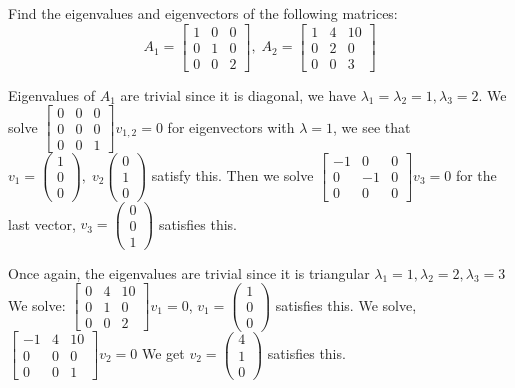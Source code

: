 \documentclass[11pt]{article}
\begin{document}
Find the eigenvalues and eigenvectors of the following matrices:
$$A_1 = \begin{bmatrix}
    1 & 0 & 0 \\
    0 & 1 & 0 \\
    0 & 0 & 2
\end{bmatrix}, \; A_2 = \begin{bmatrix}
    1 & 4 & 10 \\
    0 & 2 & 0 \\
    0 & 0 & 3
\end{bmatrix}$$

\soln

Eigenvalues of $A_1$ are trivial since it is diagonal,
we have $\lambda_1 = \lambda_2 = 1, \lambda_3 = 2$.
We solve $\begin{bmatrix}
    0 & 0 & 0 \\
    0 & 0 & 0 \\
    0 & 0 & 1
\end{bmatrix} v_{1,2} = 0$ for eigenvectors with $\lambda = 1$,
we see that $v_1 = \begin{pmatrix}
    1 \\ 0 \\ 0
\end{pmatrix}, \; v_2 \begin{pmatrix}
    0 \\ 1 \\ 0
\end{pmatrix}$ satisfy this. 
Then we solve $\begin{bmatrix}
    -1 & 0 & 0 \\
    0 & -1 & 0 \\
    0 & 0 & 0
\end{bmatrix}v_3 = 0$ for the last vector, $v_3 = \begin{pmatrix}
    0 \\ 0 \\ 1
\end{pmatrix}$ satisfies this. 

Once again, the eigenvalues are trivial since it is triangular
$\lambda_1 = 1, \lambda_2 = 2, \lambda_3 = 3$
We solve:
$\begin{bmatrix}
    0 & 4 & 10 \\
    0 & 1 & 0 \\
    0 & 0 & 2
\end{bmatrix}v_1 = 0$,
$v_1 = \begin{pmatrix}
    1 \\ 0 \\ 0
\end{pmatrix}$ satisfies this.
We solve, $\begin{bmatrix}
    -1 & 4 & 10 \\
    0 & 0 & 0 \\
    0 & 0 & 1
\end{bmatrix}v_2 = 0$
We get $v_2 = \begin{pmatrix}
    4 \\ 1 \\ 0
\end{pmatrix}$ satisfies this.
\end{document}
